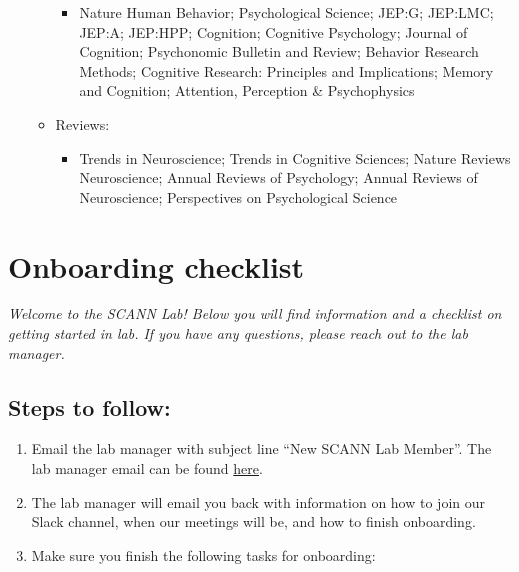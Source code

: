 \documentclass[
  12pt,
]{book}
\providecommand{\tightlist}{%
  \setlength{\itemsep}{0pt}\setlength{\parskip}{0pt}}
\begin{document}
\begin{itemize}
\begin{itemize}
    \begin{itemize}
    \tightlist
    \item
      Nature Human Behavior; Psychological Science; JEP:G; JEP:LMC; JEP:A; JEP:HPP; Cognition; Cognitive Psychology; Journal of Cognition; Psychonomic Bulletin and Review; Behavior Research Methods; Cognitive Research: Principles and Implications; Memory and Cognition; Attention, Perception \& Psychophysics
    \end{itemize}
  \item
    Reviews:

    \begin{itemize}
    \tightlist
    \item
      Trends in Neuroscience; Trends in Cognitive Sciences; Nature Reviews Neuroscience; Annual Reviews of Psychology; Annual Reviews of Neuroscience; Perspectives on Psychological Science
    \end{itemize}
  \end{itemize}
\end{itemize}

\hypertarget{onboarding}{%
\chapter{Onboarding checklist}\label{onboarding}}

\emph{Welcome to the SCANN Lab! Below you will find information and a checklist on getting started in lab. If you have any questions, please reach out to the lab manager.}

\hypertarget{steps-to-follow}{%
\section{Steps to follow:}\label{steps-to-follow}}

\begin{enumerate}
\def\labelenumi{\arabic{enumi}.}
\tightlist
\item
  Email the lab manager with subject line ``New SCANN Lab Member''. The lab manager email can be found \href{https://scannlab.psych.ufl.edu/lab-manager/}{here}.
\item
  The lab manager will email you back with information on how to join our Slack channel, when our meetings will be, and how to finish onboarding.
\item
  Make sure you finish the following tasks for onboarding:
\end{enumerate}
\end{document}
